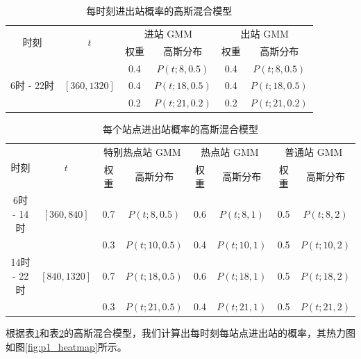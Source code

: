 \documentclass[12pt,a4paper]{mcmthesis}
\begin{document}
\begin{table}[h]
	\centering
	\caption{每时刻进出站概率的高斯混合模型}
	\label{tab:p1_gmm-time}
	\begin{tabular}{c|c|cc|cc}
		\hline
		\multirow{2}{*}{时刻} & \multirow{2}{*}{$t$} & \multicolumn{2}{c|}{进站 GMM} & \multicolumn{2}{c}{出站 GMM} \\ \cline{3-6}
		&                        & 权重 & 高斯分布      & 权重 & 高斯分布      \\ \hline
		&                        & 0.4 & $P(t;8,0.5)$ & 0.4 & $P(t;8,0.5)$ \\
		6时 - 22时 & $\left[360,1320\right]$ & 0.4 & $P(t;18,0.5)$ & 0.4 & $P(t;18,0.5)$ \\
		&                        & 0.2 & $P(t;21,0.2)$ & 0.2 & $P(t;21,0.2)$ \\ \hline
	\end{tabular}
\end{table}

        \begin{table}[h]
            \centering
            \caption{每个站点进出站概率的高斯混合模型}
            \label{tab:p1_gmm-station}
            \begin{tabular}{c|c|cc|cc|cc}
                \hline
                \multirow{2}{*}{时刻} & \multirow{2}{*}{$t$} & \multicolumn{2}{c|}{特别热点站 GMM} & \multicolumn{2}{c}{热点站 GMM} & \multicolumn{2}{c}{普通站 GMM} \\ \cline{3-6}
                &                                    & 权重  & 高斯分布     & 权重  & 高斯分布     & 权重  & 高斯分布   \\ \hline
                6时 - 14时  & $\left[360,840\right]$ & 0.7 & $P(t;8,0.5)$  & 0.6 & $P(t;8,1)$ & 0.5 & $P(t;8,2)$ \\
                           &                        & 0.3 & $P(t;10,0.5)$  & 0.4 & $P(t;10,1)$ & 0.5 & $P(t;10,2)$ \\
                14时 - 22时 & $\left[840,1320\right]$ & 0.7 & $P(t;18,0.5)$ & 0.6 & $P(t;18,1)$  & 0.5 & $P(t;18,2)$ \\
                           &                         & 0.3 & $P(t;21,0.5)$ & 0.4 & $P(t;21,1)$  & 0.5 & $P(t;21,2)$ \\ \hline
            \end{tabular}
        \end{table}

        根据表\ref{tab:p1_gmm-time}和表\ref{tab:p1_gmm-station}的高斯混合模型，我们计算出每时刻每站点进出站的概率，其热力图如图\ref{fig:p1_heatmap}所示。
\end{document}
